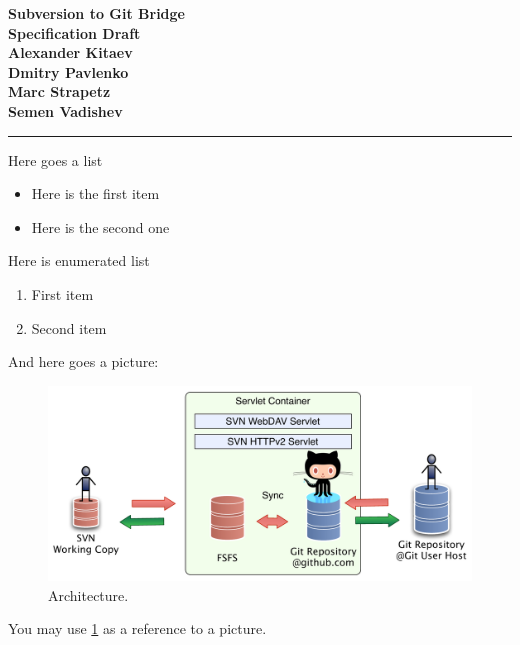 \documentclass[aps,%
12pt,%
final,%
oneside,
onecolumn,%
superscriptaddress,%
centertags]{article} %
\begin{document}
\begin{titlepage}
\begin{center}

\textbf{\LARGE Subversion to Git Bridge} \\[1.0cm]
\textbf{\Large Specification Draft} \\[2.0cm]

\textbf{Alexander Kitaev} \\[1.0cm]
\textbf{Dmitry Pavlenko} \\[1.0cm]
\textbf{Marc Strapetz} \\[1.0cm]
\textbf{Semen Vadishev} \\[1.0cm]

\end{center}
\end{titlepage}

\topmargin=-10pt
\setcounter{page}{2}

\newpage
\hrule
\tableofcontents

\newpage


\newpage

Here goes a list\newline %
\begin{itemize}
	\item Here is the first item
	\item Here is the second one
\end{itemize}

Here is enumerated list\\ %
\begin{enumerate}
	\item First item
	\item Second item
\end{enumerate}

And here goes a picture:

\begin{figure}[!h]
\label{arch}
\centering
\includegraphics[width=\linewidth]{img/servlet/components_not_that_safe.pdf}
\caption{Architecture.}
\end{figure}

You may use \ref{arch} as a reference to a picture.
\end{document}
